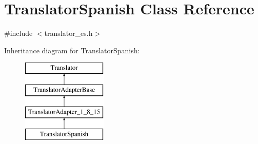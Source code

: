 \hypertarget{class_translator_spanish}{}\section{Translator\+Spanish Class Reference}
\label{class_translator_spanish}


{\ttfamily \#include $<$translator\+\_\+es.\+h$>$}

Inheritance diagram for Translator\+Spanish\+:\begin{figure}[H]
\begin{center}
\leavevmode
\includegraphics[height=4.000000cm]{class_translator_spanish}
\end{center}
\end{figure}
